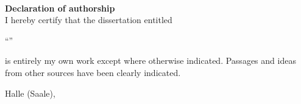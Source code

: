 \documentclass[
     paper=a4
    ,fontsize=13pt
    ,DIV=12
    ,pagesize
]{scrartcl}
\begin{document}
\thispagestyle{empty}

~ \vspace{12cm}

\textbf{\Large Declaration of authorship}\\

I hereby certify that the dissertation entitled

\begin{center}
{\large ``\thesisTitle''}
\end{center}

is entirely my own work except where otherwise indicated. Passages and ideas from other sources have been clearly indicated.
\vspace{3cm}

Halle (Saale), \thesisDate \hfill \thesisAuthor
\end{document}
